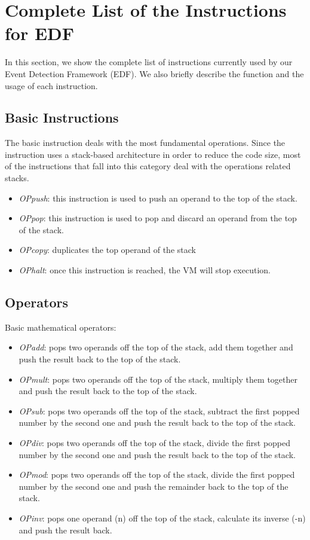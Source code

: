 \section{Complete List of the Instructions for EDF}
\label{appendix:isa}
In this section, we show the complete list of instructions currently used by our Event Detection Framework (EDF). We also briefly describe the function and the usage of each instruction.

\subsection{Basic Instructions}
The basic instruction deals with the most fundamental operations. Since the instruction uses a stack-based architecture in order to reduce the code size, most of the instructions that fall into this category deal with the operations related stacks.
\begin{itemize}
\item \emph{OPpush}: this instruction is used to push an operand to the top of the stack.
\item \emph{OPpop}: this instruction is used to pop and discard an operand from the top of the stack.
\item \emph{OPcopy}: duplicates the top operand of the stack
\item \emph{OPhalt}: once this instruction is reached, the VM will stop execution.
\end{itemize}

\subsection{Operators}
Basic mathematical operators:
\begin{itemize}
\item \emph{OPadd}: pops two operands off the top of the stack, add them together and push the result back to the top of the stack.
\item \emph{OPmult}: pops two operands off the top of the stack, multiply them together and push the result back to the top of the stack.
\item \emph{OPsub}: pops two operands off the top of the stack, subtract the first popped number by the second one and push the result back to the top of the stack.
\item \emph{OPdiv}: pops two operands off the top of the stack, divide the first popped number by the second one and push the result back to the top of the stack.
\item \emph{OPmod}: pops two operands off the top of the stack, divide the first popped number by the second one and push the remainder back to the top of the stack.
\item \emph{OPinv}: pops one operand (n) off the top of the stack, calculate its inverse (-n) and push the result back.
\end{itemize}

